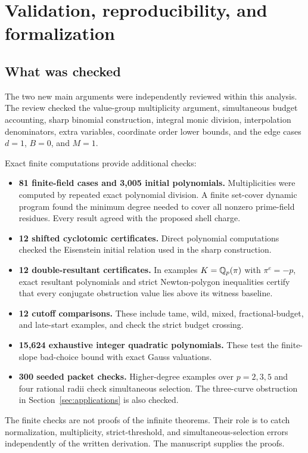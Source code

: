\section{Validation, reproducibility, and formalization}
\label{sec:validation}

\subsection{What was checked}
The two new main arguments were independently reviewed within this analysis. The review checked the value-group multiplicity argument, simultaneous budget accounting, sharp binomial construction, integral monic division, interpolation denominators, extra variables, coordinate order lower bounds, and the edge cases $d=1$, $B=0$, and $M=1$.

Exact finite computations provide additional checks:
\begin{itemize}
\item \textbf{81 finite-field cases and 3,005 initial polynomials.} Multiplicities were computed by repeated exact polynomial division. A finite set-cover dynamic program found the minimum degree needed to cover all nonzero prime-field residues. Every result agreed with the proposed shell charge.
\item \textbf{12 shifted cyclotomic certificates.} Direct polynomial computations checked the Eisenstein initial relation used in the sharp construction.
\item \textbf{12 double-resultant certificates.} In examples $K=\mathbb Q_p(\pi)$ with $\pi^e=-p$, exact resultant polynomials and strict Newton-polygon inequalities certify that every conjugate obstruction value lies above its witness baseline.
\item \textbf{12 cutoff comparisons.} These include tame, wild, mixed, fractional-budget, and late-start examples, and check the strict budget crossing.
\item \textbf{15,624 exhaustive integer quadratic polynomials.} These test the finite-slope bad-choice bound with exact Gauss valuations.
\item \textbf{300 seeded packet checks.} Higher-degree examples over $p=2,3,5$ and four rational radii check simultaneous selection. The three-curve obstruction in Section~\ref{sec:applications} is also checked.
\end{itemize}
The finite checks are not proofs of the infinite theorems. Their role is to catch normalization, multiplicity, strict-threshold, and simultaneous-selection errors independently of the written derivation. The manuscript supplies the proofs.

